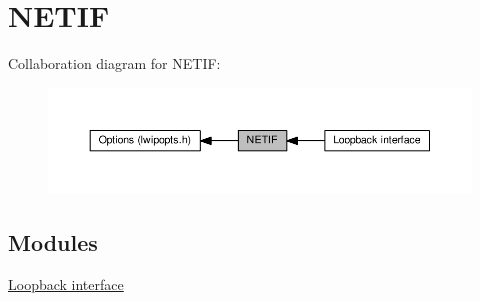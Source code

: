 \hypertarget{group__lwip__opts__netif}{}\section{N\+E\+T\+IF}
\label{group__lwip__opts__netif}
Collaboration diagram for N\+E\+T\+IF\+:
\nopagebreak
\begin{figure}[H]
\begin{center}
\leavevmode
\includegraphics[width=350pt]{group__lwip__opts__netif}
\end{center}
\end{figure}
\subsection*{Modules}
\begin{DoxyCompactItemize}
\item 
\hyperlink{group__lwip__opts__loop}{Loopback interface}
\end{DoxyCompactItemize}
